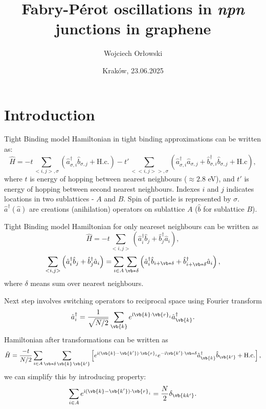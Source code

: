 \documentclass{beamer}
\author[Wojciech Orłowski]{Wojciech Orłowski}
\title[Project summary]{Fabry-Pérot oscillations in \textit{npn} junctions in graphene}
\date{Kraków, 23.06.2025}
\newcommand{\imag}{\text{i}}
\begin{document}
\frame{\titlepage}

\section{Introduction}
\begin{frame}{Tight Binding model}
	Hamiltonian in tight binding approximations can be written as:
	\begin{equation}
		\hat{H} = -t\sum_{<i,j>, \sigma}\left(\hat{a}^\dagger_{\sigma,i}\hat{b}_{\sigma,j} + \text{H.c.} \right) -t'\sum_{<<i,j>>,\sigma} \left(\hat{a}_{\sigma,i}^\dagger \hat{a}_{\sigma,j} + \hat{b}_{\sigma,i}^\dagger \hat{b}_{\sigma,j} + \text{H.c} \right),
	\end{equation}
	where $t$ is energy of hopping between nearest neighbours ($\approx 2.8$ eV), and $t'$ is energy of hopping between second nearest neighbours.
	Indexes $i$ and $j$ indicates locations in two sublattices - $A$ and $B$.
	Spin of particle is represented by $\sigma$.
	$\hat{a}^\dagger (\hat{a})$ are creations (anihilation) operators on sublattice $A$ ($\hat{b}$ for sublattice $B$).
\end{frame}

\begin{frame}{Tight Binding model}
	Hamiltonian for only neareset neighbours can be written as
	\begin{equation}
		\hat{H} = -t\sum_{<i,j>}\left(\hat{a}^\dagger_{i}\hat{b}_{j} + \hat{b}_{j}^\dagger \hat{a}_{i}  \right),
	\end{equation}
	\begin{equation}
		\sum_{<i,j>}\left(\hat{a}^\dagger_{i}\hat{b}_{j} + \hat{b}_{j}^\dagger \hat{a}_{i}  \right) = \sum_{i\in A}\sum_{\vb*{\delta}}\left(\hat{a}^\dagger_{i}\hat{b}_{i+\vb*{\delta}} + \hat{b}_{i+\vb*{\delta}}^\dagger \hat{a}_{i}\right),
	\end{equation}
	where $\delta$ means sum over nearest neighbours.
\end{frame}

\begin{frame}
	Next step involves switching operators to reciprocal space using Fourier transform
	\begin{equation}
		\hat{a}^\dagger_i = \frac{1}{\sqrt{N/2}}\sum_{\vb{k}} e^{\imag\vb{k}\cdot\vb{r}_i}\hat{a}_{\vb{k}}^\dagger.
	\end{equation}
	Hamiltonian after transformations can be written as
	\begin{equation}
		\hat{H} = \frac{-t}{N/2}\sum_{i\in A}\sum_{\vb*{
				\delta}\, \vb{k}\, \vb{k'}}\left[e^{\imag (\vb{k} - \vb{k'})\cdot \vb{r}_i} e^{-\imag\vb{k'}\cdot \vb*{\delta}}\hat{a}^\dagger_{\vb{k}} \hat{b}_{\vb{k'}} + \text{H.c.}\right],
	\end{equation}
	we can simplify this by introducing property:
	\begin{equation}
		\sum_{i\in A} e^{\imag(\vb{k} - \vb{k'})\cdot \vb{r}_i} = \frac{N}{2}\delta_{\vb{kk'}}.
	\end{equation}
\end{frame}
\end{document}
